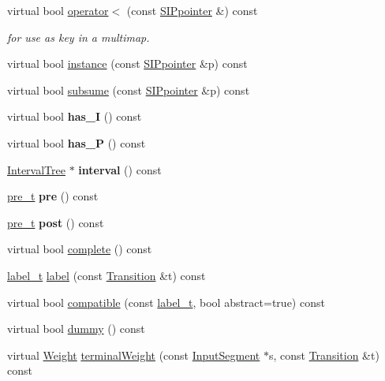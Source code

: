 \begin{DoxyCompactItemize}
\item 
virtual bool \mbox{\hyperlink{group__table_gaefff5ba3579bd6174700ab1462fa13fb}{operator$<$}} (const \mbox{\hyperlink{classSIPpointer}{S\+I\+Ppointer}} \&) const
\begin{DoxyCompactList}\small\item\em for use as key in a multimap. \end{DoxyCompactList}\item 
virtual bool \mbox{\hyperlink{group__table_gad7e14d03ea63991d16a0da5292eda82d}{instance}} (const \mbox{\hyperlink{classSIPpointer}{S\+I\+Ppointer}} \&p) const
\item 
virtual bool \mbox{\hyperlink{group__table_gae02f880deb0305e3122caf05f9d2bad0}{subsume}} (const \mbox{\hyperlink{classSIPpointer}{S\+I\+Ppointer}} \&p) const
\item 
\mbox{\label{classSIPpointer_a1166ddc463561929c52bc12f6cd47bca}} 
virtual bool {\bfseries has\+\_\+I} () const
\item 
\mbox{\label{classSIPpointer_a251168384b826897585f182320d4d8ac}} 
virtual bool {\bfseries has\+\_\+P} () const
\item 
\mbox{\label{classSIPpointer_a927bea0aa60bd7e1f9b300a7e9cfd572}} 
\mbox{\hyperlink{classIntervalTree}{Interval\+Tree}} $\ast$ {\bfseries interval} () const
\item 
\mbox{\label{classSIPpointer_a0c9365dacbf1d57e53ecf9eb3bb22240}} 
\mbox{\hyperlink{group__general_ga092fe8b972dfa977c2a0886720a7731e}{pre\+\_\+t}} {\bfseries pre} () const
\item 
\mbox{\label{classSIPpointer_a0c213749e0aae712a17837e5f9f2b15a}} 
\mbox{\hyperlink{group__general_ga092fe8b972dfa977c2a0886720a7731e}{pre\+\_\+t}} {\bfseries post} () const
\item 
virtual bool \mbox{\hyperlink{group__table_ga2f95b5a2058b20744a00737b1240bc83}{complete}} () const
\item 
\mbox{\hyperlink{group__output_ga22fde970e635fcf63962743b2d5c441d}{label\+\_\+t}} \mbox{\hyperlink{group__table_ga7f7cd8ae86d71b147fc662d3cc4977c0}{label}} (const \mbox{\hyperlink{classTransition}{Transition}} \&t) const
\item 
virtual bool \mbox{\hyperlink{group__table_gabf87df773f8e0f628e0bae79e88097db}{compatible}} (const \mbox{\hyperlink{group__output_ga22fde970e635fcf63962743b2d5c441d}{label\+\_\+t}}, bool abstract=true) const
\item 
virtual bool \mbox{\hyperlink{group__table_gaf830b0bf9d24b53e4674de49308b7853}{dummy}} () const
\item 
virtual \mbox{\hyperlink{classWeight}{Weight}} \mbox{\hyperlink{group__table_ga01caac75d66ff2e272a248c7e1954415}{terminal\+Weight}} (const \mbox{\hyperlink{classInputSegment}{Input\+Segment}} $\ast$s, const \mbox{\hyperlink{classTransition}{Transition}} \&t) const
\end{DoxyCompactItemize}
